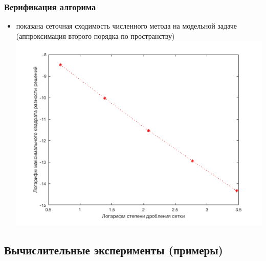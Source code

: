 \documentclass[unicode,aspectratio=43]{beamer}
\begin{document}
\begin{frame}\frametitle{Верификация алгорима}
	
	\begin{itemize}
		\small
		\item показана сеточная сходимость численного метода на модельной задаче (аппроксимация второго порядка по пространству)
			\includegraphics[scale=0.45]{shod.png}
	\end{itemize}
\end{frame}	

\subsection{Вычислительные эксперименты (примеры)}
\end{document}
